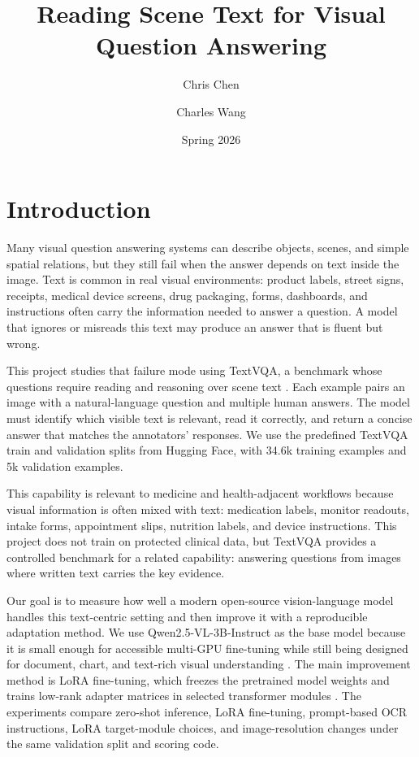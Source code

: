\documentclass[11pt]{article}
\title{Reading Scene Text for Visual Question Answering}
\author{Chris Chen \and Charles Wang}
\date{Spring 2026}
\begin{document}
\maketitle

\section{Introduction}

Many visual question answering systems can describe objects, scenes, and simple spatial relations, but they still fail when the answer depends on text inside the image. Text is common in real visual environments: product labels, street signs, receipts, medical device screens, drug packaging, forms, dashboards, and instructions often carry the information needed to answer a question. A model that ignores or misreads this text may produce an answer that is fluent but wrong.

This project studies that failure mode using TextVQA, a benchmark whose questions require reading and reasoning over scene text \cite{singh2019textvqa}. Each example pairs an image with a natural-language question and multiple human answers. The model must identify which visible text is relevant, read it correctly, and return a concise answer that matches the annotators' responses. We use the predefined TextVQA train and validation splits from Hugging Face, with 34.6k training examples and 5k validation examples.

This capability is relevant to medicine and health-adjacent workflows because visual information is often mixed with text: medication labels, monitor readouts, intake forms, appointment slips, nutrition labels, and device instructions. This project does not train on protected clinical data, but TextVQA provides a controlled benchmark for a related capability: answering questions from images where written text carries the key evidence.

Our goal is to measure how well a modern open-source vision-language model handles this text-centric setting and then improve it with a reproducible adaptation method. We use Qwen2.5-VL-3B-Instruct as the base model because it is small enough for accessible multi-GPU fine-tuning while still being designed for document, chart, and text-rich visual understanding \cite{bai2025qwen25vl}. The main improvement method is LoRA fine-tuning, which freezes the pretrained model weights and trains low-rank adapter matrices in selected transformer modules \cite{hu2022lora}. The experiments compare zero-shot inference, LoRA fine-tuning, prompt-based OCR instructions, LoRA target-module choices, and image-resolution changes under the same validation split and scoring code.
\end{document}
